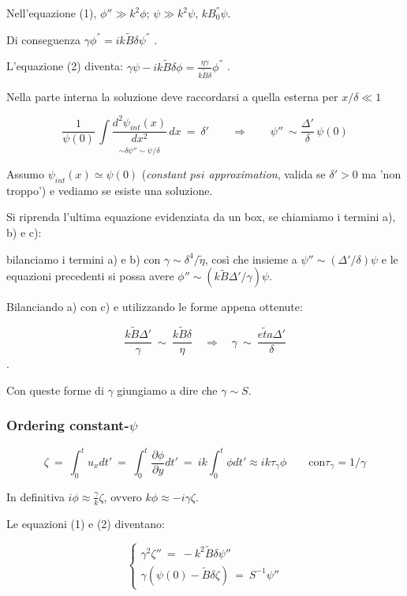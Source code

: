 Nell'equazione (1), $\phi ''\gg k^2 \phi$; $\psi \gg k^2 \psi$, $kB_0^{''} \psi$.

Di conseguenza $\boxed{\gamma \phi^{''} = ik\tilde{B}\delta \psi^{''}}$ .

L'equazione (2) diventa: $\boxed{\gamma \psi - i k\tilde{B} \delta \phi = \frac{\eta \gamma}{k \tilde{B} \delta} \phi^{''}}$ .

Nella parte interna la soluzione deve raccordarsi a quella esterna per $x/\delta \ll 1$

\[ \frac{1}{\psi (0)}\, \underset{\sim \delta \psi ''\sim \psi/\delta}{ \int \frac{d^2\psi_{int} (x) }{dx^2}\, dx}\ =\ \delta '
\qquad \Rightarrow \qquad
\psi ''\ \sim \frac{\Delta '}{\delta}\, \psi (0)\]

Assumo $\psi_{int} (x)\simeq \psi(0)$ (\emph{constant $psi$ approximation}, valida se $\delta ' >0$ ma 'non troppo') e vediamo se esiste una soluzione.

Si riprenda l'ultima equazione evidenziata da un box, se chiamiamo i termini a), b) e c): 

bilanciamo i termini a) e b) con $\gamma \sim \delta^4 / \tilde{\eta}$, così che insieme a $\psi '' \sim (\Delta '/ \delta) \psi$ e le equazioni precedenti si possa avere $\phi '' \sim (k\tilde{B} \Delta '/\gamma)\psi$.

Bilanciando a) con c) e utilizzando le forme appena ottenute:

\[\frac{k\tilde{B} \Delta '}{\gamma}\ \sim\ \frac{k\tilde{B} \delta}{\eta} \quad \Rightarrow \quad \gamma\ \sim\ \frac{\tilde{eta}\Delta '}{\delta}\].

Con queste forme di $\gamma$ giungiamo a dire che $\gamma \sim S$.

%
\subsubsection{Ordering constant-$\psi$}
\[\zeta\ =\ \int^t_0 u_x dt'\ =\ \int^t_0 \frac{\partial \phi}{\partial y} dt'\ =\ ik\int^t_0 \phi dt' \approx ik \tau_\gamma \phi\qquad \text{con} \tau_\gamma =1/\gamma\]

In definitiva $i\phi\approx \frac{\gamma}{k} \zeta$, ovvero $k\phi\approx -i\gamma \zeta$.

Le equazioni (1) e (2) diventano:

\[\begin{cases}
	\gamma^2 \zeta ''\ =\ -k^2 \tilde{B} \delta \psi ''\\
	\gamma \left(\psi(0) - \tilde{B}\delta\zeta\right)\ =\ S^{-1} \psi ''
\end{cases}\]

